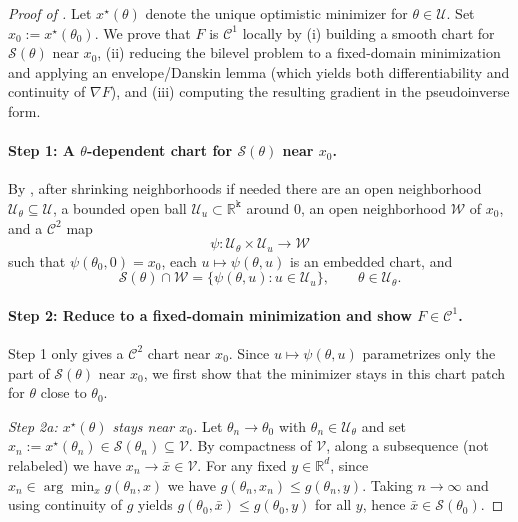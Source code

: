\documentclass{article}
\theoremstyle{normaltheorem}
\newcommand{\dimk}{\texttt{k}}
\newcommand{\R}{\mathbb{R}}
\newcommand{\calS}{\mathcal{S}}
\begin{document}
		\begin{proof}[Proof of ]
		Let $x^\star(\theta)$ denote the unique optimistic minimizer for $\theta\in\mathcal U$.
		Set \(x_0:=x^\star(\theta_0)\).
		We prove that $F$ is $\mathcal{C}^{1}$ locally by (i) building a smooth chart for $\calS(\theta)$ near $x_0$,
		(ii) reducing the bilevel problem to a fixed-domain minimization and applying an envelope/Danskin lemma (which yields both differentiability and continuity of $\nabla F$),
		and (iii) computing the resulting gradient in the pseudoinverse form.

		\paragraph{Step 1: A $\theta$-dependent chart for $\calS(\theta)$ near $x_0$.}
			By , after shrinking neighborhoods if needed there are an open neighborhood
			\(\mathcal U_\theta\subseteq\mathcal U\), a bounded open ball \(\mathcal U_u\subset\R^{\dimk}\) around \(0\), an open
			neighborhood \(\mathcal W\) of \(x_0\), and a \(\mathcal{C}^{2}\) map
		\[
		\psi:\mathcal U_\theta\times\mathcal U_u\to\mathcal W
		\]
		such that \(\psi(\theta_0,0)=x_0\), each \(u\mapsto\psi(\theta,u)\) is an embedded chart, and
		\[
		\calS(\theta)\cap\mathcal W=\{\psi(\theta,u):u\in\mathcal U_u\},
		\qquad \theta\in\mathcal U_\theta .
		\]

			\paragraph{Step 2: Reduce to a fixed-domain minimization and show $F\in\mathcal{C}^{1}$.}
			Step 1 only gives a $\mathcal{C}^{2}$ chart near $x_0$. Since $u\mapsto \psi(\theta,u)$ parametrizes only the part of $\calS(\theta)$ near $x_0$,
			we first show that the minimizer stays in this chart patch for $\theta$ close to $\theta_0$.
			
			\emph{Step 2a: $x^\star(\theta)$ stays near $x_0$.}
			Let $\theta_n\to\theta_0$ with $\theta_n\in\mathcal U_\theta$ and set $x_n:=x^\star(\theta_n)\in\calS(\theta_n)\subseteq\mathcal V$.
			By compactness of $\mathcal V$, along a subsequence (not relabeled) we have $x_n\to \bar x\in\mathcal V$.
			For any fixed $y\in\R^d$, since $x_n\in\arg\min_x g(\theta_n,x)$ we have $g(\theta_n,x_n)\le g(\theta_n,y)$.
			Taking $n\to\infty$ and using continuity of $g$ yields $g(\theta_0,\bar x)\le g(\theta_0,y)$ for all $y$, hence $\bar x\in\calS(\theta_0)$.
			

\end{proof}
\end{document}
